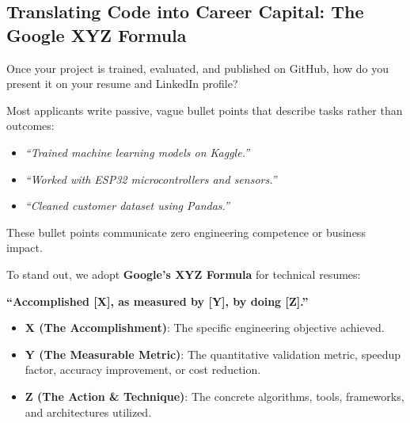 \subsection{Translating Code into Career Capital: The Google XYZ Formula}\label{subsec:resume_portfolio}

Once your project is trained, evaluated, and published on GitHub, how do you present it on your resume and LinkedIn profile?

Most applicants write passive, vague bullet points that describe tasks rather than outcomes:
\begin{itemize}
    \item \emph{``Trained machine learning models on Kaggle.''}
    \item \emph{``Worked with ESP32 microcontrollers and sensors.''}
    \item \emph{``Cleaned customer dataset using Pandas.''}
\end{itemize}
These bullet points communicate zero engineering competence or business impact.

To stand out, we adopt \textbf{Google's XYZ Formula} for technical resumes:
\begin{center}
\Large\textbf{``Accomplished [X], as measured by [Y], by doing [Z].''}
\end{center}
\begin{itemize}
    \item \textbf{X (The Accomplishment)}: The specific engineering objective achieved.
    \item \textbf{Y (The Measurable Metric)}: The quantitative validation metric, speedup factor, accuracy improvement, or cost reduction.
    \item \textbf{Z (The Action \& Technique)}: The concrete algorithms, tools, frameworks, and architectures utilized.
\end{itemize}


